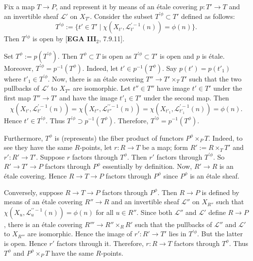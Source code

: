 \documentclass{article}
\begin{document}
Fix a map $T \to P$, and represent it by means of an \'{e}tale covering $p : T' \to T$ and an invertible sheaf $\mathcal{L}'$ on $X_{T'}$. Consider the subset $T^{\prime\phi} \subset T'$ defined as follows:
\[
T^{\prime\phi} := \{ t' \in T' \mid \chi(X_{t'}, \mathcal{L}_{t'}^{\prime-1}(n)) = \phi(n) \}.
\]
Then $T^{\prime\phi}$ is open by [\textbf{EGA III}$_2$, 7.9.11].

Set $T^{\phi} := p(T^{\prime\phi})$. Then $T^{\phi} \subset T$ is open as $T^{\prime\phi} \subset T'$ is open and $p$ is \'{e}tale. Moreover, $T^{\prime\phi} = p^{-1}(T^{\phi})$. Indeed, let $t' \in p^{-1}(T^{\phi})$. Say $p(t') = p(t'_1)$ where $t'_1 \in T^{\prime\phi}$. Now, there is an \'{e}tale covering $T'' \to T' \times_T T'$ such that the two pullbacks of $\mathcal{L}'$ to $X_{T''}$ are isomorphic. Let $t'' \in T''$ have image $t' \in T'$ under the first map $T'' \to T'$ and have the image $t'_1 \in T'$ under the second map. Then
\[
\chi(X_{t'}, \mathcal{L}_{t'}^{\prime-1}(n)) = \chi(X_{t''}, \mathcal{L}_{t''}^{\prime\prime-1}(n)) = \chi(X_{t'_1}, \mathcal{L}_{t'_1}^{\prime-1}(n)) = \phi(n).
\]
Hence $t' \in T^{\prime\phi}$. Thus $T^{\prime\phi} \supset p^{-1}(T^{\phi})$. Therefore, $T^{\prime\phi} = p^{-1}(T^{\phi})$.

Furthermore, $T^{\phi}$ is (represents) the fiber product of functors $P^{\phi} \times_P T$. Indeed, to see they have the same $R$-points, let $r : R \to T$ be a map; form $R' := R \times_T T'$ and $r' : R' \to T'$. Suppose $r$ factors through $T^{\phi}$. Then $r'$ factors through $T^{\prime\phi}$. So $R' \to T' \to P$ factors through $P^{\phi}$ essentially by definition. Now, $R' \to R$ is an \'{e}tale covering. Hence $R \to T \to P$ factors through $P^{\phi}$ since $P^{\phi}$ is an \'{e}tale sheaf.

Conversely, suppose $R \to T \to P$ factors through $P^{\phi}$. Then $R \to P$ is defined by means of an \'{e}tale covering $R'' \to R$ and an invertible sheaf $\mathcal{L}''$ on $X_{R''}$ such that $\chi(X_u, \mathcal{L}_u^{\prime\prime-1}(n)) = \phi(n)$ for all $u \in R''$. Since both $\mathcal{L}''$ and $\mathcal{L}'$ define $R \to P$, there is an \'{e}tale covering $R''' \to R'' \times_R R'$ such that the pullbacks of $\mathcal{L}''$ and $\mathcal{L}'$ to $X_{R'''}$ are isomorphic. Hence the image of $r' : R' \to T'$ lies in $T^{\prime\phi}$. But the latter is open. Hence $r'$ factors through it. Therefore, $r : R \to T$ factors through $T^{\phi}$. Thus $T^{\phi}$ and $P^{\phi} \times_P T$ have the same $R$-points.
\end{document}
